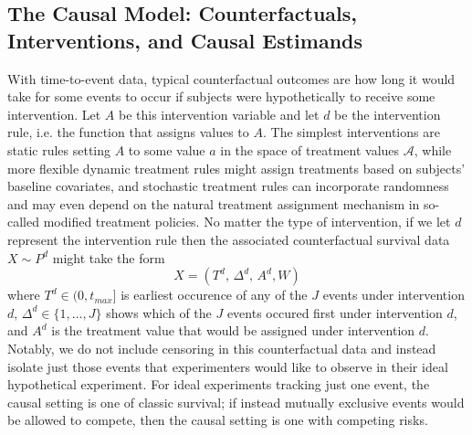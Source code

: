 \documentclass{report}
\newcommand{\1}{\ensuremath{\mathbf{1}}}
\renewcommand{\L}{\ensuremath{W}}
\begin{document}
\subsection{The Causal Model: Counterfactuals, Interventions, and Causal Estimands}
\label{CausalData}
With time-to-event data, typical counterfactual outcomes are how long it would take for some events to occur if subjects were hypothetically to receive some intervention. Let \(A\) be this intervention variable and let \(d\) be the intervention rule, i.e. the function that assigns values to \(A\). The simplest interventions are static rules setting \(A\) to some value \(a\) in the space of treatment values \(\mathcal{A}\), while more flexible dynamic treatment rules might assign treatments based on subjects' baseline covariates, and stochastic treatment rules can incorporate randomness and may even depend on the natural treatment assignment mechanism in so-called modified treatment policies. No matter the type of intervention, if we let \(d\) represent the intervention rule then the associated counterfactual survival data \(X \sim P^d\) might take the form
\begin{equation}
 X = \left(T^d,\, \Delta^d,\, A^d, \L \right) \label{causaldata}
\end{equation}
where \(T^d \in (0, t_{max}]\) is earliest occurence of any of the \(J\) events under intervention \(d\), \(\Delta^d \in \{1, \dots, J\}\) shows which of the \(J\) events occured first under intervention \(d\), and \(A^d\) is the treatment value that would be assigned under intervention \(d\). Notably, we do not include censoring in this counterfactual data and instead isolate just those events that experimenters would like to observe in their ideal hypothetical experiment. For ideal experiments tracking just one event, the causal setting is one of classic survival; if instead mutually exclusive events would be allowed to compete, then the causal setting is one with competing risks. 
\end{document}
